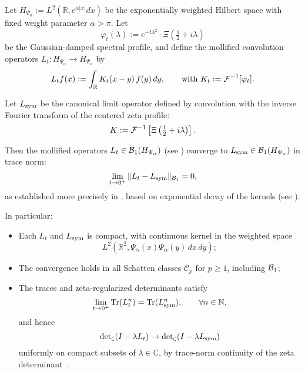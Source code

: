 \begin{lemma}
\label{lem:kernel_trace_norm_convergence}
Let \( H_{\Psi_\alpha} := L^2(\mathbb{R}, e^{\alpha |x|} dx) \) be the exponentially weighted Hilbert space with fixed weight parameter \( \alpha > \pi \). Let
\[
\varphi_t(\lambda) := e^{-t\lambda^2} \cdot \Xi\left( \tfrac{1}{2} + i\lambda \right)
\]
be the Gaussian-damped spectral profile, and define the mollified convolution operators \( L_t \colon H_{\Psi_\alpha} \to H_{\Psi_\alpha} \) by
\[
L_t f(x) := \int_{\mathbb{R}} K_t(x - y)\, f(y)\, dy, \qquad \text{with } K_t := \mathcal{F}^{-1}[\varphi_t].
\]

Let \( L_{\mathrm{sym}} \) be the canonical limit operator defined by convolution with the inverse Fourier transform of the centered zeta profile:
\[
K := \mathcal{F}^{-1}\left[ \Xi\left(\tfrac{1}{2} + i\lambda \right) \right].
\]

\medskip
\noindent
Then the mollified operators \( L_t \in \mathcal{B}_1(H_{\Psi_\alpha}) \) (see ) converge to \( L_{\mathrm{sym}} \in \mathcal{B}_1(H_{\Psi_\alpha}) \) in trace norm:
\[
\lim_{t \to 0^+} \| L_t - L_{\mathrm{sym}} \|_{\mathcal{B}_1} = 0,
\]
as established more precisely in , based on exponential decay of the kernels (see ).

\medskip
\noindent
In particular:
\begin{itemize}
  \item Each \( L_t \) and \( L_{\mathrm{sym}} \) is compact, with continuous kernel in the weighted space
  \[
  L^2\left( \mathbb{R}^2, \Psi_\alpha(x) \Psi_\alpha(y) \, dx \, dy \right);
  \]
  \item The convergence holds in all Schatten classes \( \mathcal{C}_p \) for \( p \ge 1 \), including \( \mathcal{B}_1 \);
  \item The traces and zeta-regularized determinants satisfy
  \[
  \lim_{t \to 0^+} \operatorname{Tr}(L_t^n) = \operatorname{Tr}(L_{\mathrm{sym}}^n), \qquad \forall n \in \mathbb{N},
  \]
  and hence
  \[
  \det\nolimits_{\zeta}(I - \lambda L_t) \to \det\nolimits_{\zeta}(I - \lambda L_{\mathrm{sym}})
  \]
  uniformly on compact subsets of \( \lambda \in \mathbb{C} \), by trace-norm continuity of the zeta determinant~\cite[Ch.~4]{Simon2005TraceIdeals}.
\end{itemize}
\end{lemma}
